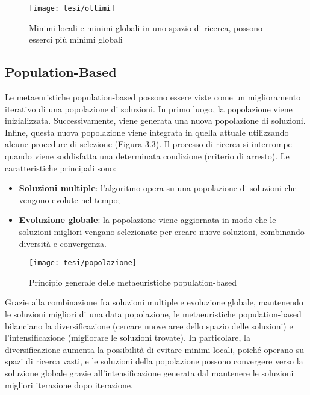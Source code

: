 \begin{figure}[!ht] 
    \centering 
    \texttt{[image: tesi/ottimi]} 
    \caption{Minimi locali e minimi globali in uno spazio di ricerca, possono esserci più minimi globali}
\end{figure}

\subsection{Population-Based} \hypertarget{pb}{}

Le metaeuristiche population-based possono essere viste come un miglioramento iterativo di una popolazione di soluzioni. In primo luogo, la popolazione viene inizializzata. Successivamente, viene generata una nuova popolazione di soluzioni. Infine, questa nuova popolazione viene integrata in quella attuale utilizzando alcune procedure di selezione (Figura 3.3). Il processo di ricerca si interrompe quando viene soddisfatta una determinata condizione (criterio di arresto). %
Le caratteristiche principali sono:
\begin{itemize}
    \item \textbf{Soluzioni multiple}: l'algoritmo opera su una popolazione di soluzioni che vengono evolute nel tempo;
    \item \textbf{Evoluzione globale}: la popolazione viene aggiornata in modo che le soluzioni migliori vengano selezionate per creare nuove soluzioni, combinando diversità e convergenza.
\end{itemize}

\begin{figure}[!ht] 
    \centering 
    \texttt{[image: tesi/popolazione]} 
    \caption{Principio generale delle metaeuristiche population-based}
\end{figure}

Grazie alla combinazione fra soluzioni multiple e evoluzione globale, mantenendo le soluzioni migliori di una data popolazione, le metaeuristiche population-based bilanciano la diversificazione (cercare nuove aree dello spazio delle soluzioni) e l'intensificazione (migliorare le soluzioni trovate). In particolare, la diversificazione aumenta la possibilità di evitare minimi locali, poiché operano su spazi di ricerca vasti, e le soluzioni della popolazione possono convergere verso la soluzione globale grazie all'intensificazione generata dal mantenere le soluzioni migliori iterazione dopo iterazione.

